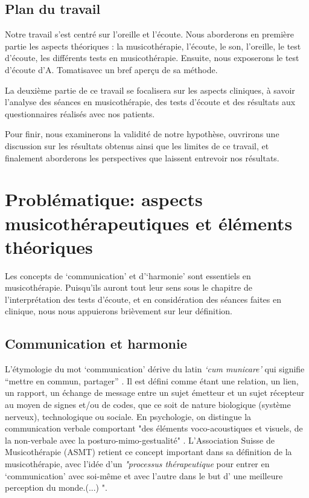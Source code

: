 
\section*{Plan du travail}
Notre travail s'est centré sur l'oreille et l'écoute.
Nous aborderons en première partie les aspects théoriques : la musicothérapie, l'écoute, le son, l'oreille, 
le
test d'écoute, les différents tests en musicothérapie. Ensuite, nous
exposerons le test d'écoute d'A. Tomatis\textsuperscript \textregistered avec un bref aperçu de sa 
méthode.


La deuxième partie de ce travail se focalisera sur les aspects
cliniques, à savoir l'analyse des séances en  musicothérapie,  des tests d'écoute et des résultats aux 
questionnaires  réalisés  avec  nos patients.



Pour finir, nous examinerons la validité de notre hypothèse, ouvrirons
une discussion sur les résultats obtenus ainsi que les limites de ce
travail, et finalement aborderons les perspectives que
laissent entrevoir nos résultats.


\chapter{Problématique: aspects musicothérapeutiques et éléments théoriques}
Les concepts de `communication' et  d'`harmonie'
sont essentiels en
musicothérapie. Puisqu'ils auront tout  leur sens sous le chapitre de l'interprétation des tests
d'écoute, et en considération des séances faites en clinique, nous nous appuierons brièvement
sur leur définition. 
\section{Communication et harmonie }
L'étymologie du mot `communication' dérive du latin  \textit{`cum
  municare'} qui signifie ``mettre en commun, partager'' \autocite{dicpetitrobert}.
Il est défini comme étant une
relation, un lien, un rapport, un échange de message entre un sujet émetteur et un
sujet récepteur au moyen de signes et/ou de codes, que ce soit de nature biologique (système nerveux), technologique ou sociale. En psychologie, on distingue la communication verbale comportant "des éléments voco-acoustiques et visuels, de la non-verbale avec la posturo-mimo-gestualité" \autocite{doronparot}.
L'Association Suisse
de Musicothérapie (ASMT) retient ce concept important dans sa définition de la musicothérapie, avec 
l'idée  d'un\textit{ "processus thérapeutique }pour entrer en `communication' avec soi-même et avec
l'autre dans le but d' une meilleure perception du
monde.(...) "\autocite{site_musitherapy}.

